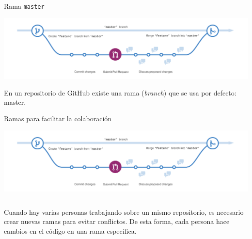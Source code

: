 \documentclass[xcolor={usenames,svgnames,dvipsnames}]{beamer}
\begin{document}
\begin{frame}[label={sec:org8c65397},fragile]{Rama \texttt{master}}
 \begin{center}
\includegraphics[width=.9\linewidth]{figs/branching.png}
\end{center}

En un repositorio de GitHub existe una rama (\emph{branch}) que se usa por defecto: \alert{master}.
\end{frame}

\begin{frame}[label={sec:org9514780}]{Ramas para facilitar la colaboración}
\begin{center}
\includegraphics[width=.9\linewidth]{figs/branching.png}
\end{center}

\begin{columns}
\begin{column}{0.6\columnwidth}
Cuando hay varias personas trabajando sobre un mismo repositorio, es necesario crear nuevas ramas para evitar conflictos. De esta forma, cada persona hace cambios en el código en una rama específica.
\end{column}


\end{columns}
\end{frame}
\end{document}
